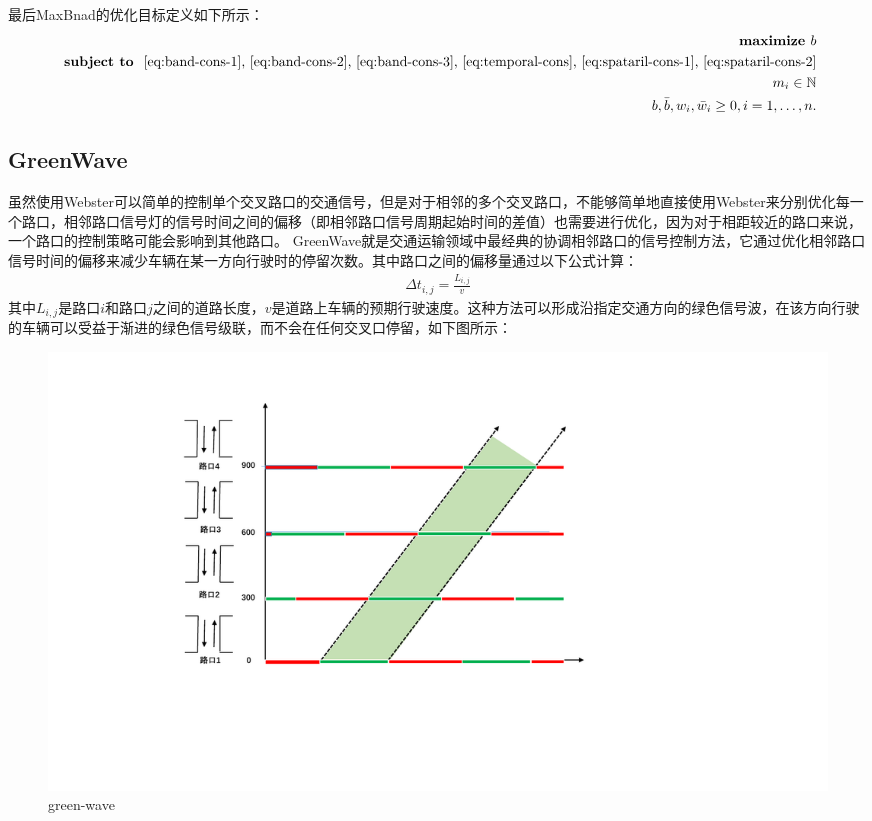 最后MaxBnad的优化目标定义如下所示：
\begin{equation}
    \begin{split}
        \textbf { maximize } b \\
        \textbf { subject to } \text { \ref{eq:band-cons-1}, \ref{eq:band-cons-2}, \ref{eq:band-cons-3}, \ref{eq:temporal-cons}, \ref{eq:spataril-cons-1}, \ref{eq:spataril-cons-2}} \\
        {m_{i} \in \mathbb{N}} \\
        {b, \bar{b}, w_{i}, \bar{w}_{i} \geq 0, i=1, \ldots, n}.
    \end{split}
\end{equation}

\subsection{GreenWave}
虽然使用Webster可以简单的控制单个交叉路口的交通信号，但是对于相邻的多个交叉路口，不能够简单地直接使用Webster来分别优化每一个路口，相邻路口信号灯的信号时间之间的偏移（即相邻路口信号周期起始时间的差值）也需要进行优化，因为对于相距较近的路口来说，一个路口的控制策略可能会影响到其他路口。
GreenWave就是交通运输领域中最经典的协调相邻路口的信号控制方法，它通过优化相邻路口信号时间的偏移来减少车辆在某一方向行驶时的停留次数。其中路口之间的偏移量通过以下公式计算：
\begin{align}
    \label{eq:green-wave}
    \Delta t_{i, j}=\frac{L_{i, j}}{v}
\end{align}
其中$L_{i, j}$是路口$i$和路口$j$之间的道路长度，$v$是道路上车辆的预期行驶速度。这种方法可以形成沿指定交通方向的绿色信号波，在该方向行驶的车辆可以受益于渐进的绿色信号级联，而不会在任何交叉口停留，如下图所示：
\begin{figure}[htb]
    \includegraphics[width=1.2\textwidth]{fig/green-ware.pdf}
    \caption{green-wave}
    \label{fig:green-wave}
\end{figure}

